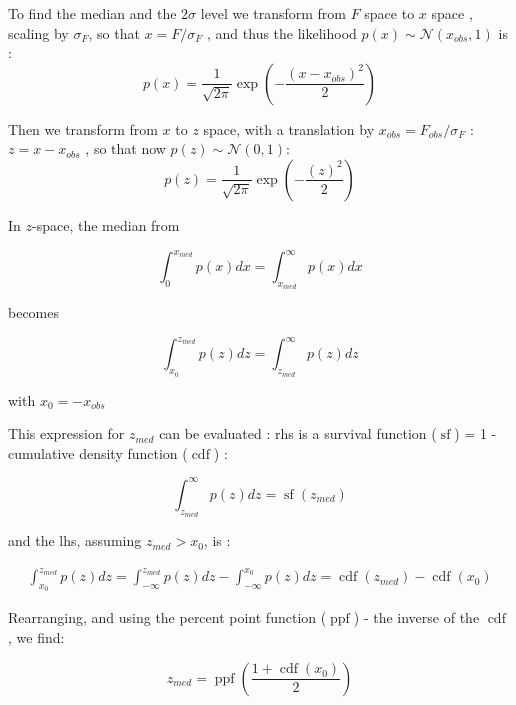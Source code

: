 \documentclass[fleqn,usenatbib]{mnras}  %
\DeclareMathOperator\cdf{cdf}
\DeclareMathOperator\sf{sf}
\DeclareMathOperator\ppf{ppf}
\begin{document}
\bigskip

To find the median and the $2\sigma$ level we transform from $F$ space to $x$ space , scaling by  $\sigma_{F}$, so that $x = F / \sigma_{F}$ , and thus the likelihood $p(x) \sim \mathcal{N}(x_{obs},1)$ is :
\begin{equation}
p(x) = \frac{1}{\sqrt{2  \pi }} \exp{ \left(-\frac{(x-x_{obs})^{2}}{2}\right)}
\end{equation}

Then we transform from $x$ to $z$ space, with  a translation by $x_{obs} = F_{obs} / \sigma_{F}$ :  $z = x - x_{obs}$  , so that now  $p(z) \sim \mathcal{N}(0,1)$:
\begin{equation}
p(z) = \frac{1}{\sqrt{2  \pi }} \exp{ \left(-\frac{(z)^{2}}{2}\right)}
\end{equation}



In $z$-space, the median from 

\begin{equation}
\int_{0}^{x_{med}} {p(x)dx} = \int_{x_{med}}^{\infty} {p(x)dx}
\end{equation}
 
becomes 

\begin{equation}
\int_{x_{0}}^{z_{med}}{p(z)dz} = \int_{z_{med}}^{\infty}{p(z)dz}
\end{equation}

with  $x_{0}=-x_{obs}$

\bigskip

This expression for $z_{med}$ can be evaluated : rhs is  a survival function ($\sf$) = 1 - cumulative density function ($\cdf$) : 

\begin{equation}
\int_{z_{med}}^{\infty}{p(z)dz} = \sf(z_{med})
\end{equation}

and the lhs, assuming $z_{med} > x_{0}$, is :

\begin{multline}
\int_{x_{0}}^{z_{med}}{p(z)dz} = \int_{-\infty}^{z_{med}}{p(z)dz} - \int_{-\infty}^{x_{0}}{p(z)dz} = \cdf(z_{med}) - \cdf(x_{0})
\end{multline}

Rearranging, and using the percent point function ($\ppf$) - the inverse of the $\cdf$, we find:

\begin{equation}
z_{med} = \ppf \left( \frac{1+\cdf(x_{0})}{2} \right)
\end{equation}
\end{document}
